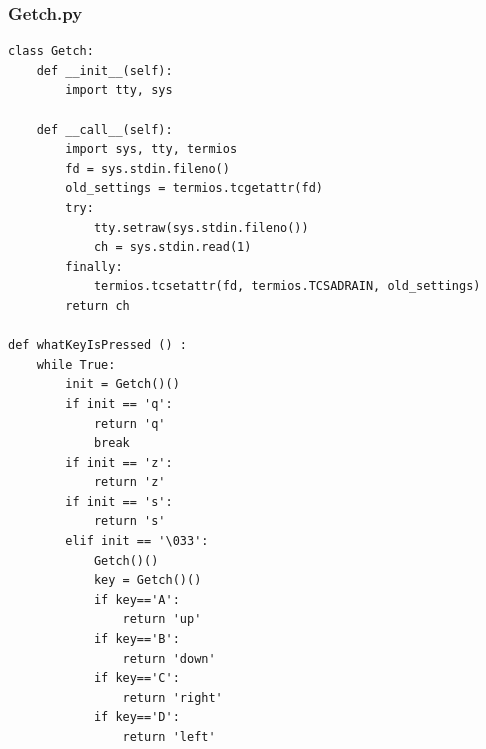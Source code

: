 \documentclass[twoside,twocolumn, 16pt]{article}
\begin{document}
\subsubsection{Getch.py}

\begin{lstlisting}
class Getch:
	def __init__(self):
		import tty, sys

	def __call__(self):
		import sys, tty, termios
		fd = sys.stdin.fileno()
		old_settings = termios.tcgetattr(fd)
		try:
			tty.setraw(sys.stdin.fileno())
			ch = sys.stdin.read(1)
		finally:
			termios.tcsetattr(fd, termios.TCSADRAIN, old_settings)
		return ch

def whatKeyIsPressed () :
	while True:
		init = Getch()()
		if init == 'q':
			return 'q'
			break
		if init == 'z':
			return 'z'
		if init == 's':
			return 's'
		elif init == '\033':
			Getch()()
			key = Getch()()
			if key=='A':
				return 'up'
			if key=='B':
				return 'down'
			if key=='C':
				return 'right'
			if key=='D':
				return 'left'
\end{lstlisting}
\end{document}
